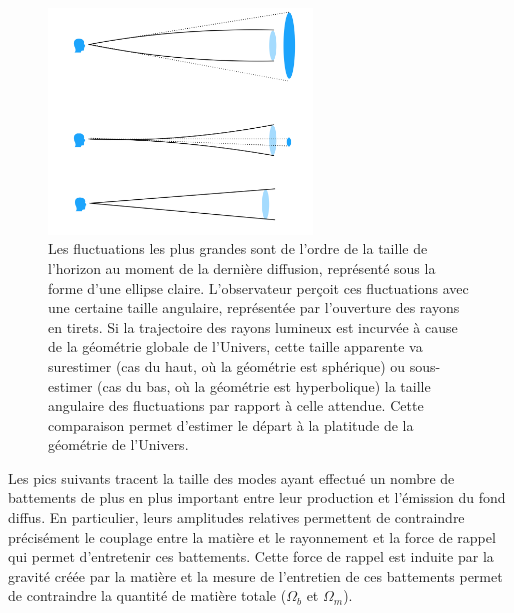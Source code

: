 \begin{figure}[htbp]
	\centering
		\includegraphics[height=6cm]{figs/cmb_geom.png}
		\caption[CMB et géométrie]{Les fluctuations les plus grandes sont de l'ordre de la taille de l'horizon au moment de la dernière diffusion, représenté sous la forme d'une ellipse claire. L'observateur perçoit ces fluctuations avec une certaine taille angulaire, représentée par l'ouverture des rayons en tirets. Si la trajectoire des rayons lumineux est incurvée à cause de la géométrie globale de l'Univers, cette taille apparente va surestimer (cas du haut, où la géométrie est sphérique) ou sous-estimer (cas du bas, où la géométrie est hyperbolique) la taille angulaire des fluctuations par rapport à celle attendue. Cette comparaison permet d'estimer le départ à la platitude de la géométrie de l'Univers.  }
	\label{f:cmb_geom}
\end{figure}

Les pics suivants tracent la taille des modes ayant effectué un nombre de battements de plus en plus important entre leur production et l'émission du fond diffus. En particulier, leurs amplitudes relatives permettent de contraindre précisément le couplage entre la matière et le rayonnement et la force de rappel qui permet d'entretenir ces battements. Cette force de rappel est induite par la gravité créée par la matière et la mesure de l'entretien de ces battements permet de contraindre la quantité de matière totale ($\Omega_b$ et $\Omega_m$). 


